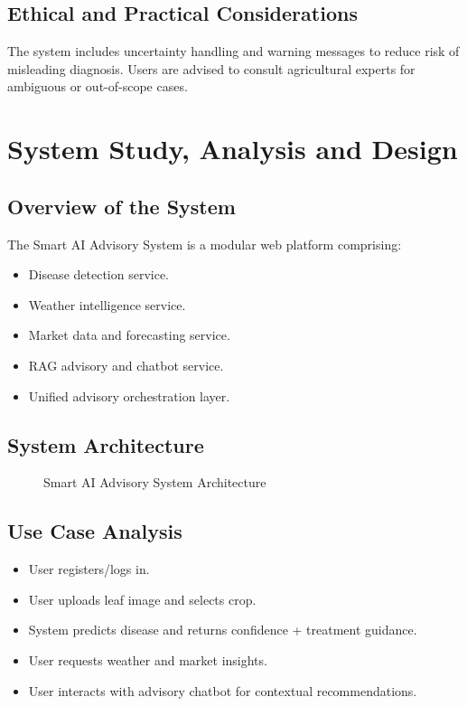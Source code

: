 \documentclass[12pt,a4paper]{report}
\begin{document}
\section{Ethical and Practical Considerations}
The system includes uncertainty handling and warning messages to reduce risk of misleading diagnosis. Users are advised to consult agricultural experts for ambiguous or out-of-scope cases.

\chapter{System Study, Analysis and Design}

\section{Overview of the System}
The Smart AI Advisory System is a modular web platform comprising:
\begin{itemize}[noitemsep]
    \item Disease detection service.
    \item Weather intelligence service.
    \item Market data and forecasting service.
    \item RAG advisory and chatbot service.
    \item Unified advisory orchestration layer.
\end{itemize}

\section{System Architecture}
\begin{figure}[H]
    \centering
    \caption{Smart AI Advisory System Architecture}
\end{figure}

\section{Use Case Analysis}
\begin{itemize}[noitemsep]
    \item User registers/logs in.
    \item User uploads leaf image and selects crop.
    \item System predicts disease and returns confidence + treatment guidance.
    \item User requests weather and market insights.
    \item User interacts with advisory chatbot for contextual recommendations.
\end{itemize}
\end{document}
